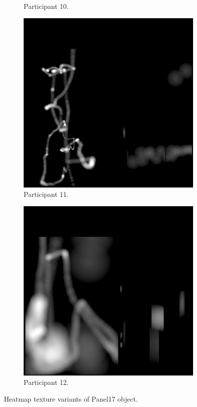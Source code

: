 \begin{figure}[!ht]
\begin{subfigure}[b]{0.24\textwidth}
        \caption{Participant 10.}
    \end{subfigure}
    \hfill    
    \begin{subfigure}[b]{0.24\textwidth}
        \centering
        \includegraphics[width=\textwidth]{img/data/Panel17/single/11.png}
        \caption{Participant 11.}
    \end{subfigure}
    \hfill    
    \begin{subfigure}[b]{0.24\textwidth}
        \centering
        \includegraphics[width=\textwidth]{img/data/Panel17/single/12.png}
        \caption{Participant 12.}
    \end{subfigure}
    \caption{Heatmap texture variants of Panel17 object.}
    \label{fig:Panel17-object-heatmaps.}
\end{figure}


